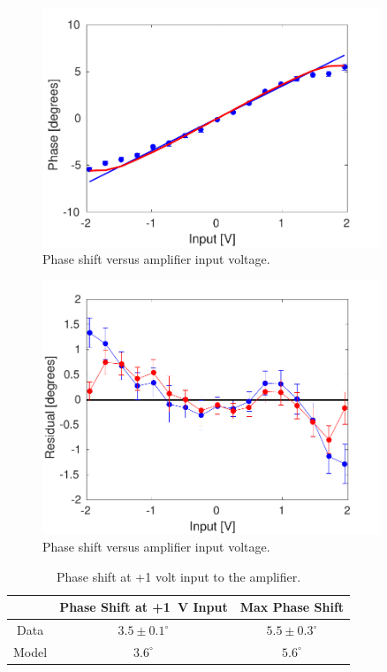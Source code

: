 \begin{figure}
  \centering
  \includegraphics[width=0.9\textwidth]{Figures/commissioning/phaseVsAmpVoltage}
  \caption{Phase shift versus amplifier input voltage.}
  \label{f:phaseVsAmpVoltage}
\end{figure}

\begin{figure}
  \centering
  \includegraphics[width=0.9\textwidth]{Figures/commissioning/phaseVsAmpVoltage_residuals}
  \caption{Phase shift versus amplifier input voltage.}
  \label{f:phaseVsAmp_resid}
\end{figure}

\begin{table}
  \begin{center}
    \begin{tabular}{| c | c | c |}
	   \hline
        & Phase Shift at +1~V Input & Max Phase Shift \\ \hline
       Data & \(3.5\pm0.1^\circ\) & \(5.5\pm0.3^\circ\) \\
	   Model & \(3.6^\circ\) & \(5.6^\circ\) \\
 	   \hline
    \end{tabular}
    \caption{Phase shift at +1 volt input to the amplifier.}
  	\label{t:PhaseVsDAC}
  \end{center}
\end{table}

